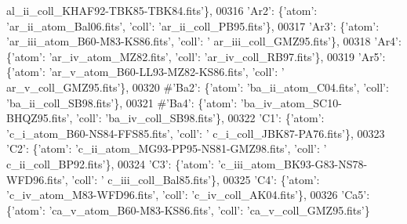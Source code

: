 \begin{DoxyCode}
{      al\_ii\_coll\_KHAF92-TBK85-TBK84.fits'}\},
00316                              \textcolor{stringliteral}{'Ar2'}: \{\textcolor{stringliteral}{'atom'}: \textcolor{stringliteral}{'ar\_ii\_atom\_Bal06.fits'}, \textcolor{stringliteral}{'coll'}: \textcolor{stringliteral}{'ar\_ii\_coll\_PB95.fits'}\},
00317                              \textcolor{stringliteral}{'Ar3'}: \{\textcolor{stringliteral}{'atom'}: \textcolor{stringliteral}{'ar\_iii\_atom\_B60-M83-KS86.fits'}, \textcolor{stringliteral}{'coll'}: \textcolor{stringliteral}{'
      ar\_iii\_coll\_GMZ95.fits'}\},
00318                              \textcolor{stringliteral}{'Ar4'}: \{\textcolor{stringliteral}{'atom'}: \textcolor{stringliteral}{'ar\_iv\_atom\_MZ82.fits'}, \textcolor{stringliteral}{'coll'}: \textcolor{stringliteral}{'ar\_iv\_coll\_RB97.fits'}\},
00319                              \textcolor{stringliteral}{'Ar5'}: \{\textcolor{stringliteral}{'atom'}: \textcolor{stringliteral}{'ar\_v\_atom\_B60-LL93-MZ82-KS86.fits'}, \textcolor{stringliteral}{'coll'}: \textcolor{stringliteral}{'
      ar\_v\_coll\_GMZ95.fits'}\},
00320                              \textcolor{comment}{#'Ba2': \{'atom': 'ba\_ii\_atom\_C04.fits', 'coll': 'ba\_ii\_coll\_SB98.fits'\},}
00321                              \textcolor{comment}{#'Ba4': \{'atom': 'ba\_iv\_atom\_SC10-BHQZ95.fits', 'coll':
       'ba\_iv\_coll\_SB98.fits'\},}
00322                              \textcolor{stringliteral}{'C1'}: \{\textcolor{stringliteral}{'atom'}: \textcolor{stringliteral}{'c\_i\_atom\_B60-NS84-FFS85.fits'}, \textcolor{stringliteral}{'coll'}: \textcolor{stringliteral}{'
      c\_i\_coll\_JBK87-PA76.fits'}\},
00323                              \textcolor{stringliteral}{'C2'}: \{\textcolor{stringliteral}{'atom'}: \textcolor{stringliteral}{'c\_ii\_atom\_MG93-PP95-NS81-GMZ98.fits'}, \textcolor{stringliteral}{'coll'}: \textcolor{stringliteral}{'
      c\_ii\_coll\_BP92.fits'}\},
00324                              \textcolor{stringliteral}{'C3'}: \{\textcolor{stringliteral}{'atom'}: \textcolor{stringliteral}{'c\_iii\_atom\_BK93-G83-NS78-WFD96.fits'}, \textcolor{stringliteral}{'coll'}: \textcolor{stringliteral}{'
      c\_iii\_coll\_Bal85.fits'}\},
00325                              \textcolor{stringliteral}{'C4'}: \{\textcolor{stringliteral}{'atom'}: \textcolor{stringliteral}{'c\_iv\_atom\_M83-WFD96.fits'}, \textcolor{stringliteral}{'coll'}: \textcolor{stringliteral}{'c\_iv\_coll\_AK04.fits'}\},
00326                              \textcolor{stringliteral}{'Ca5'}: \{\textcolor{stringliteral}{'atom'}: \textcolor{stringliteral}{'ca\_v\_atom\_B60-M83-KS86.fits'}, \textcolor{stringliteral}{'coll'}: \textcolor{stringliteral}{'ca\_v\_coll\_GMZ95.fits'}\}

\end{DoxyCode}
